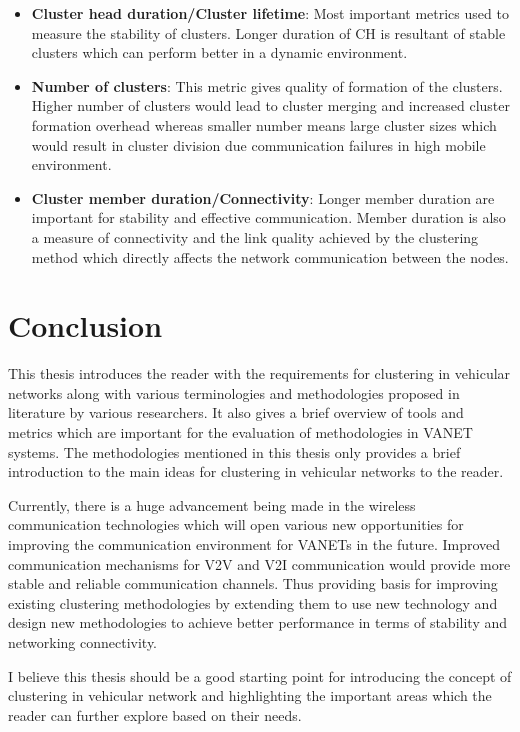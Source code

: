 \documentclass[]{ccs-thesis}
\begin{document}
\begin{itemize}
    \item \textbf{Cluster head duration/Cluster lifetime}: Most important metrics used to measure the stability of clusters.
          Longer duration of \ac{CH} is resultant of stable clusters which can perform better in a dynamic environment.
    \item \textbf{Number of clusters}: This metric gives quality of formation of the clusters. Higher number of clusters
          would lead to cluster merging and increased cluster formation overhead whereas smaller number means large cluster sizes
          which would result in cluster division due communication failures in high mobile environment.
    \item \textbf{Cluster member duration/Connectivity}: Longer member duration are important for stability and effective
          communication. Member duration is also a measure of connectivity and the link quality achieved by the clustering method
          which directly affects the network communication between the nodes.
\end{itemize}


\chapter{Conclusion}
\label{sec:conclusions}

This thesis introduces the reader with the requirements for clustering in vehicular networks along with various
terminologies and methodologies proposed in literature by various researchers. It also gives a brief overview
of tools and metrics which are important for the evaluation of methodologies in \ac{VANET} systems. The methodologies
mentioned in this thesis only provides a brief introduction to the main ideas for clustering in vehicular networks to
the reader.

Currently, there is a huge advancement being made in the wireless communication technologies which will open
various new opportunities for improving the communication environment for \ac{VANET}s in the future.
Improved communication mechanisms for \ac{V2V} and \ac{V2I} communication would provide more stable and
reliable communication channels. Thus providing basis for improving existing clustering methodologies by
extending them to use new technology and design new methodologies to achieve better performance in terms
of stability and networking connectivity.

I believe this thesis should be a good starting point for introducing the concept of clustering in vehicular
network and highlighting the important areas which the reader can further explore based on their needs.

\cleardoublepage

\listofabbreviations
\clearpage

\listoffigures
\clearpage

\listoftables
\clearpage

\printbibliography
\end{document}
